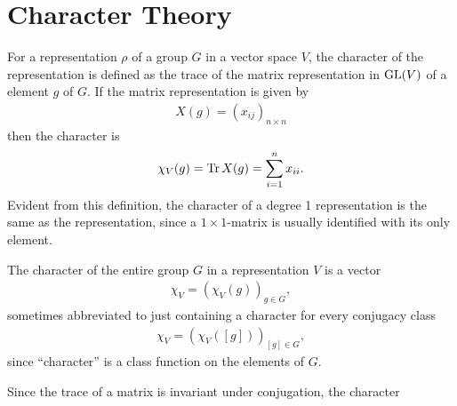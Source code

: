 \clearpage{\thispagestyle{empty}}
\section{Character Theory}

	For a representation $\rho$ of a group $G$ in a vector space $V$, the character of the representation is defined as the trace of the matrix representation in $\text{GL}(V)$ of a element $g$ of $G$. If the matrix representation is given by
	\begin{align}
		X(g) = \left( x_{ij} \right)_{n \times n}
	\end{align}
	then the character is
	\begin{align}
		\chi_V(g) = \Tr X(g) = \sum_{i=1}^{n} x_{ii}.
	\end{align}
	Evident from this definition, the character of a degree 1 representation is the same as the representation, since a $1 \times 1$-matrix is usually identified with its only element.
	
	The character of the entire group $G$ in a representation $V$ is a vector 
	\begin{align}
		\chi_V = \left( \chi_V(g) \right)_{g \in G},
	\end{align}
	sometimes abbreviated to just containing a character for every conjugacy class
	\begin{align}
		\chi_V = \left( \chi_V([g]) \right)_{[g] \in G},
	\end{align}
	since ``character'' is a class function on the elements of $G$.
	
	Since the trace of a matrix is invariant under conjugation, the character